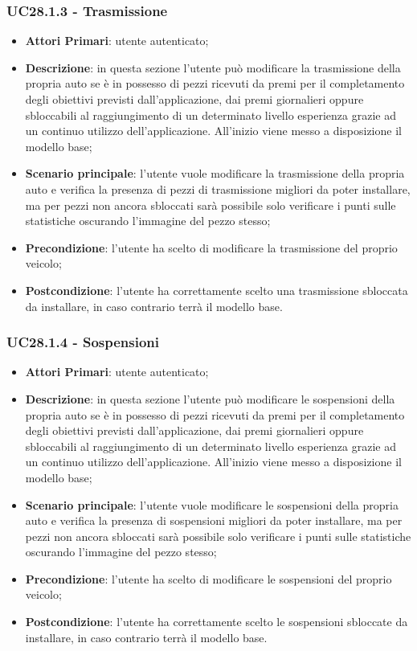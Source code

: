 \subsubsection{UC28.1.3 - Trasmissione}
\begin{itemize}
	\item \textbf{Attori Primari}: utente autenticato;
	\item \textbf{Descrizione}: in questa sezione l'utente può modificare la trasmissione della propria auto se è in possesso di pezzi ricevuti da premi per il completamento degli obiettivi previsti dall'applicazione, dai premi giornalieri oppure sbloccabili al raggiungimento di un determinato livello esperienza grazie ad un continuo utilizzo dell'applicazione.
	All'inizio viene messo a disposizione il modello base;
	\item \textbf{Scenario principale}: l'utente vuole modificare la trasmissione della propria auto e verifica la presenza di pezzi di trasmissione migliori da poter installare, ma per pezzi non ancora sbloccati sarà possibile solo verificare i punti sulle statistiche oscurando l'immagine del pezzo stesso;
	\item \textbf{Precondizione}: l'utente ha scelto di modificare la trasmissione del proprio veicolo; 
	\item \textbf{Postcondizione}: l'utente ha correttamente scelto una trasmissione sbloccata da installare, in caso contrario terrà il modello base.
\end{itemize}
\subsubsection{UC28.1.4 - Sospensioni}
\begin{itemize}
	\item \textbf{Attori Primari}: utente autenticato;
	\item \textbf{Descrizione}: in questa sezione l'utente può modificare le sospensioni della propria auto se è in possesso di pezzi ricevuti da premi per il completamento degli obiettivi previsti dall'applicazione, dai premi giornalieri oppure sbloccabili al raggiungimento di un determinato livello esperienza grazie ad un continuo utilizzo dell'applicazione.
	All'inizio viene messo a disposizione il modello base;
	\item \textbf{Scenario principale}: l'utente vuole modificare le sospensioni della propria auto e verifica la presenza di sospensioni migliori da poter installare, ma per pezzi non ancora sbloccati sarà possibile solo verificare i punti sulle statistiche oscurando l'immagine del pezzo stesso;
	\item \textbf{Precondizione}: l'utente ha scelto di modificare le sospensioni del proprio veicolo; 
	\item \textbf{Postcondizione}: l'utente ha correttamente scelto le sospensioni sbloccate da installare, in caso contrario terrà il modello base.
\end{itemize}
